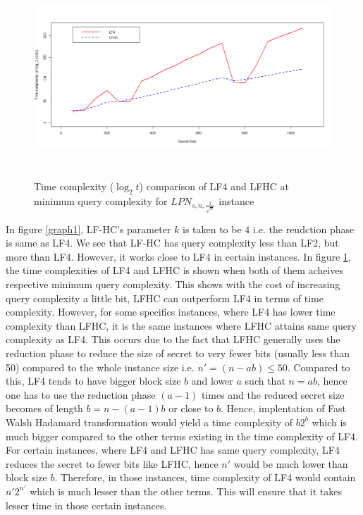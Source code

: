 \documentclass{article}
\begin{document}
 \begin{figure}
 	\includegraphics[width=\textwidth, height= 7.5cm]{LPNTime}
 	\caption{Time complexity ($\log_2t$) comparison of LF4 and LFHC at minimum query complexity for $LPN_{s,n,\frac{1}{\sqrt{n}}}$ instance}
 	\label{graph2}
 \end{figure}

 
 In figure \ref{graph1}, LF-HC's parameter $k$ is taken to be $4$ i.e. the reudction phase is same as LF4. We see that LF-HC has query complexity less than LF2, but more than LF4. However, it works close to LF4 in certain instances. In figure \ref{graph2}, the time complexities of LF4 and LFHC is shown when both of them acheives respective minimum query complexity. This shows with the cost of increasing query complexity a little bit, LFHC can outperform LF4 in terms of time complexity. However, for some specifics instances, where LF4 has lower time complexity than LFHC, it is the same instances where LFHC attains same query complexity as LF4. This occurs due to the fact that LFHC generally uses the reduction phase to reduce the size of secret to very fewer bits (usually less than 50) compared to the whole instance size  i.e. $n'=(n-ab)\leq50$. Compared to this, LF4 tends to have bigger block size $b$ and lower $a$ such that $n=ab$, hence one has to use the reduction phase $(a-1)$ times and the reduced secret size becomes of length $b=n-(a-1)b$ or close to $b$. Hence, implentation of Fast Walsh Hadamard transformation would yield a time complexity of $b2^b$ which is much bigger compared to the other terms existing in the time complexity of LF4. For certain instances, where LF4 and LFHC has same query complexity, LF4 reduces the secret to fewer bits like LFHC, hence $n'$ would be much lower than block size $b$. Therefore, in those instances, time complexity of LF4 would contain $n'2^{n'}$ which is much lesser than the other terms. This will ensure that it takes lesser time in those certain instances.
 
\end{document}
